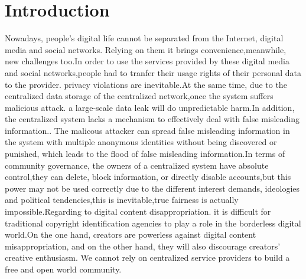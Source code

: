 \documentclass{article}
\begin{document}
\section{Introduction}\label{introduction}
    Nowadays, people's digital life cannot be separated from the Internet, digital media and social networks. Relying on them it brings convenience,meanwhile, new challenges too.In order to use the services provided by these digital media and social networks,people had to tranfer their usage rights of their personal data to the provider\cite{twitter_tos}\cite{facebook_tos}. privacy violations are inevitable.At the same time, due to the centralized data storage of the centralized network,once the system suffers malicious attack. a large-scale data leak will do unpredictable harm.In addition, the centralized system lacks a mechanism to effectively deal with false misleading information.\cite{twitter_fakenews}\cite{fb_fakenews}. The malicous attacker can spread false misleading information in the system with multiple anonymous identities without being discovered or punished, which leads to the flood of false misleading information.In terms of community governance, the owners of a centralized system have absolute control,they can delete, block information, or directly disable accounts,but this power may not be used correctly due to the different interest demands, ideologies and political tendencies,this is inevitable,true fairness is actually impossible.Regarding to digital content disappropriation. it is difficult for traditional copyright identification agencies to play a role in the borderless digital world.On the one hand, creators are powerless against digital content misappropriation, and on the other hand, they will also discourage creators' creative enthusiasm. We cannot rely on centralized service providers to build a free and open world community.
\end{document}
